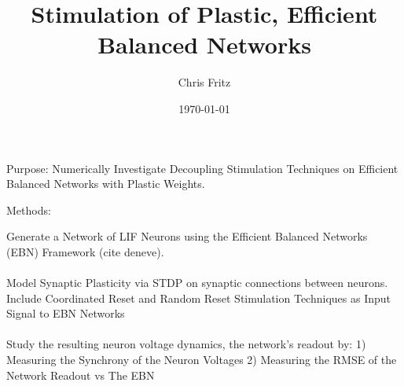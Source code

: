 \documentclass{article}
\title{Stimulation of Plastic, Efficient Balanced Networks}
\author{Chris Fritz}
\date{\today}
\numberwithin{equation}{section}
\begin{document}
\maketitle


Purpose: Numerically Investigate Decoupling Stimulation Techniques on Efficient Balanced Networks with Plastic Weights. 

Methods: 

Generate a Network of LIF Neurons using the Efficient Balanced Networks (EBN) Framework (cite deneve).  
\\
\\
Model Synaptic Plasticity via STDP on synaptic connections between neurons. 
\\
Include Coordinated Reset and Random Reset Stimulation Techniques as Input Signal to EBN Networks
\\
\\
Study the resulting neuron voltage dynamics, the network's readout by:  1) Measuring the Synchrony of the Neuron Voltages  2) Measuring the RMSE of the Network Readout vs The EBN 

\clearpage
\end{document}
